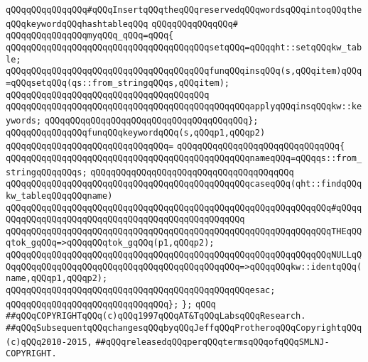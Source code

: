 \newline
\verb|qQQqqQQqqQQqqQQq#qQQqInsertqQQqtheqQQqreservedqQQqwordsqQQqintoqQQqtheqQQqkeywordqQQqhashtableqQQq|\newline
\verb|qQQqqQQqqQQqqQQq#|\newline
\verb|qQQqqQQqqQQqqQQqmyqQQq_qQQq=qQQq{|\newline
\verb|qQQqqQQqqQQqqQQqqQQqqQQqqQQqqQQqqQQqqQQqsetqQQq=qQQqqht::setqQQqkw_table;|\newline
\verb|qQQqqQQqqQQqqQQqqQQqqQQqqQQqqQQqqQQqqQQqfunqQQqinsqQQq(s,qQQqitem)qQQq=qQQqsetqQQq(qs::from_stringqQQqs,qQQqitem);|\newline
\verb|qQQqqQQqqQQqqQQqqQQqqQQqqQQqqQQqqQQqqQQq|\newline
\verb|qQQqqQQqqQQqqQQqqQQqqQQqqQQqqQQqqQQqqQQqqQQqqQQqapplyqQQqinsqQQqkw::keywords;|\newline
\verb|qQQqqQQqqQQqqQQqqQQqqQQqqQQqqQQqqQQqqQQq};|\newline
\newline
\verb|qQQqqQQqqQQqqQQqfunqQQqkeywordqQQq(s,qQQqp1,qQQqp2)|\newline
\verb|qQQqqQQqqQQqqQQqqQQqqQQqqQQqqQQq=|\newline
\verb|qQQqqQQqqQQqqQQqqQQqqQQqqQQqqQQq{|\newline
\verb|qQQqqQQqqQQqqQQqqQQqqQQqqQQqqQQqqQQqqQQqqQQqqQQqnameqQQq=qQQqqs::from_stringqQQqqQQqs;|\newline
\verb|qQQqqQQqqQQqqQQqqQQqqQQqqQQqqQQqqQQqqQQq|\newline
\verb|qQQqqQQqqQQqqQQqqQQqqQQqqQQqqQQqqQQqqQQqqQQqqQQqcaseqQQq(qht::findqQQqkw_tableqQQqqQQqname)|\newline
\verb|qQQqqQQqqQQqqQQqqQQqqQQqqQQqqQQqqQQqqQQqqQQqqQQqqQQqqQQqqQQqqQQq#qQQqqQQqqQQqqQQqqQQqqQQqqQQqqQQqqQQqqQQqqQQqqQQqqQQq|\newline
\verb|qQQqqQQqqQQqqQQqqQQqqQQqqQQqqQQqqQQqqQQqqQQqqQQqqQQqqQQqqQQqqQQqTHEqQQqtok_gqQQq=>qQQqqQQqtok_gqQQq(p1,qQQqp2);|\newline
\verb|qQQqqQQqqQQqqQQqqQQqqQQqqQQqqQQqqQQqqQQqqQQqqQQqqQQqqQQqqQQqqQQqNULLqQQqqQQqqQQqqQQqqQQqqQQqqQQqqQQqqQQqqQQqqQQqqQQq=>qQQqqQQqkw::identqQQq(name,qQQqp1,qQQqp2);|\newline
\verb|qQQqqQQqqQQqqQQqqQQqqQQqqQQqqQQqqQQqqQQqqQQqqQQqesac;|\newline
\newline
\verb|qQQqqQQqqQQqqQQqqQQqqQQqqQQqqQQq};|\newline
\verb|};|\newline
\verb|qQQq|\newline
\newline
\newline
\verb|##qQQqCOPYRIGHTqQQq(c)qQQq1997qQQqAT&TqQQqLabsqQQqResearch.|\newline
\verb|##qQQqSubsequentqQQqchangesqQQqbyqQQqJeffqQQqProtheroqQQqCopyrightqQQq(c)qQQq2010-2015,|\newline
\verb|##qQQqreleasedqQQqperqQQqtermsqQQqofqQQqSMLNJ-COPYRIGHT.|\newline

